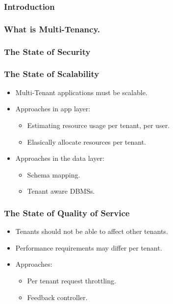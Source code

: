 \documentclass{beamer}
\begin{document}
\begin{frame}\frametitle{\textbf{\LARGE{\textrm{Introduction}}}}
\end{frame}

\begin{frame}\frametitle{\textbf{\LARGE{\textrm{What is Multi-Tenancy.}}}}
\end{frame}

\begin{frame}\frametitle{\textbf{\LARGE{\textrm{The State of Security}}}}
\end{frame}

\begin{frame}\frametitle{\textbf{\LARGE{\textrm{The State of Scalability}}}}
	\begin{itemize}
		\item Multi-Tenant applications must be scalable.
		\item Approaches in app layer:
			\begin{itemize}
				\item Estimating resource usage per tenant, per user.
				\item Elasically allocate resources per tenant.
			\end{itemize}
		\item Approaches in the data layer:
			\begin{itemize}
				\item Schema mapping.
				\item Tenant aware DBMSs.
			\end{itemize}
	\end{itemize}
\end{frame}

\begin{frame}\frametitle{\textbf{\LARGE{\textrm{The State of Quality of Service}}}}
	\begin{itemize}
		\item Tenants should not be able to affect other tenants.
		\item Performance requirements may differ per tenant.
		\item Approaches:
			\begin{itemize}
				\item Per tenant request throttling.
				\item Feedback controller.
			\end{itemize}
	\end{itemize}
\end{frame}
\end{document}
